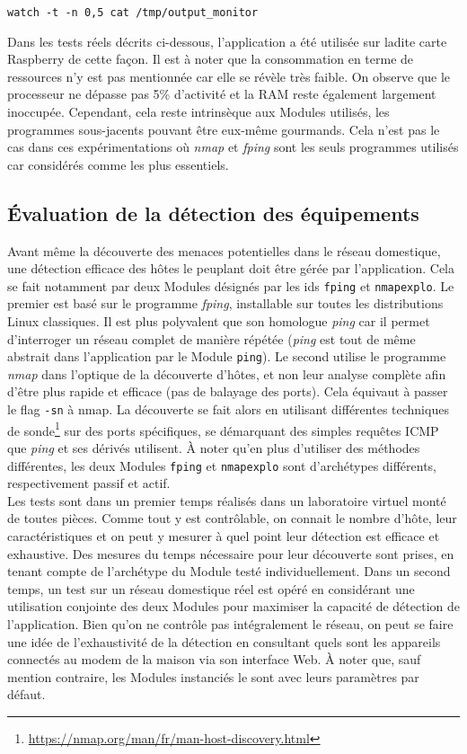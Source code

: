 \documentclass[]{article}
\begin{document}
\indent \texttt{watch -t -n 0,5 cat /tmp/output\_monitor}
\vspace{0.4cm}

Dans les tests réels décrits ci-dessous, l'application a été utilisée sur ladite carte Raspberry de cette façon. Il est à noter que la consommation en terme de ressources n'y est pas mentionnée car elle se révèle très faible. On observe que le processeur ne dépasse pas 5\% d'activité et la RAM reste également largement inoccupée. Cependant, cela reste intrinsèque aux Modules utilisés, les programmes sous-jacents pouvant être eux-même gourmands. Cela n'est pas le cas dans ces expérimentations où \textit{nmap} et \textit{fping} sont les seuls programmes utilisés car considérés comme les plus essentiels.


\subsection{Évaluation de la détection des équipements}

Avant même la découverte des menaces potentielles dans le réseau domestique, une détection efficace des hôtes le peuplant doit être gérée par l'application. Cela se fait notamment par deux Modules désignés par les ids \texttt{fping} et \texttt{nmapexplo}. Le premier est basé sur le programme \textit{fping}, installable sur toutes les distributions Linux classiques. Il est plus polyvalent que son homologue \textit{ping} car il permet d'interroger un réseau complet de manière répétée (\textit{ping} est tout de même abstrait dans l'application par le Module \texttt{ping}). Le second utilise le programme \textit{nmap} dans l'optique de la découverte d'hôtes, et non leur analyse complète afin d'être plus rapide et efficace (pas de balayage des ports). Cela équivaut à passer le flag \texttt{-sn} à nmap. La découverte se fait alors en utilisant différentes techniques de sonde\footnote{\url{https://nmap.org/man/fr/man-host-discovery.html}} sur des ports spécifiques, se démarquant des simples requêtes ICMP que \textit{ping} et ses dérivés utilisent. À noter qu'en plus d'utiliser des méthodes différentes, les deux Modules \texttt{fping} et \texttt{nmapexplo} sont d'archétypes différents, respectivement passif et actif.\\

Les tests sont dans un premier temps réalisés dans un laboratoire virtuel monté de toutes pièces. Comme tout y est contrôlable, on connait le nombre d'hôte, leur caractéristiques et on peut y mesurer à quel point leur détection est efficace et exhaustive. Des mesures du temps nécessaire pour leur découverte sont prises, en tenant compte de l'archétype du Module testé individuellement. Dans un second temps, un test sur un réseau domestique réel est opéré en considérant une utilisation conjointe des deux Modules pour maximiser la capacité de détection de l'application. Bien qu'on ne contrôle pas intégralement le réseau, on peut se faire une idée de l'exhaustivité de la détection en consultant quels sont les appareils connectés au modem de la maison via son interface Web. À noter que, sauf mention contraire, les Modules instanciés le sont avec leurs paramètres par défaut.  
\end{document}
